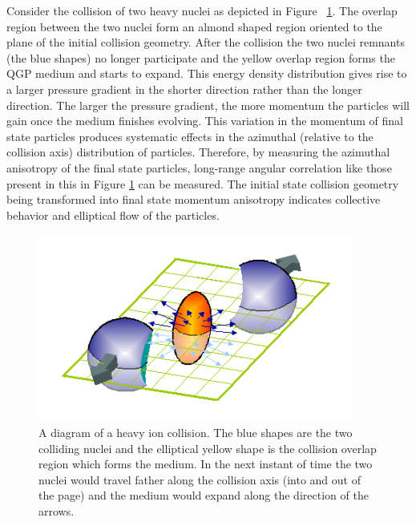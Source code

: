 Consider the collision of two heavy nuclei as depicted in Figure ~\ref{fig:flow_diagram_cart}. The overlap region between the two nuclei form an almond shaped region oriented to the plane of the initial collision geometry. After the collision the two nuclei remnants (the blue shapes) no longer participate and the yellow overlap region forms the QGP medium and starts to expand. This energy density distribution gives rise to a larger pressure gradient in the shorter direction rather than the longer direction. The larger the pressure gradient, the more momentum the particles will gain once the medium finishes evolving. This variation in the momentum of final state particles produces systematic effects in the azimuthal (relative to the collision axis) distribution of particles. Therefore, by measuring the azimuthal anisotropy of the final state particles, long-range angular correlation like those present in this in Figure \ref{fig:flow_diagram_cart} can be measured. The initial state collision geometry being transformed into final state momentum anisotropy indicates collective behavior and elliptical flow of the particles.

\begin{figure}[!ht]
\begin{center}
\includegraphics[width=0.65\linewidth]{figs/flow_diagram_cartoon.png}
\caption{A diagram of a heavy ion collision. The blue shapes are the two colliding nuclei and the elliptical yellow shape is the collision overlap region which forms the medium. In the next instant of time the two nuclei would travel father along the collision axis (into and out of the page) and the medium would expand along the direction of the arrows.}
\end{center}
\label{fig:flow_diagram_cart}
\end{figure}


